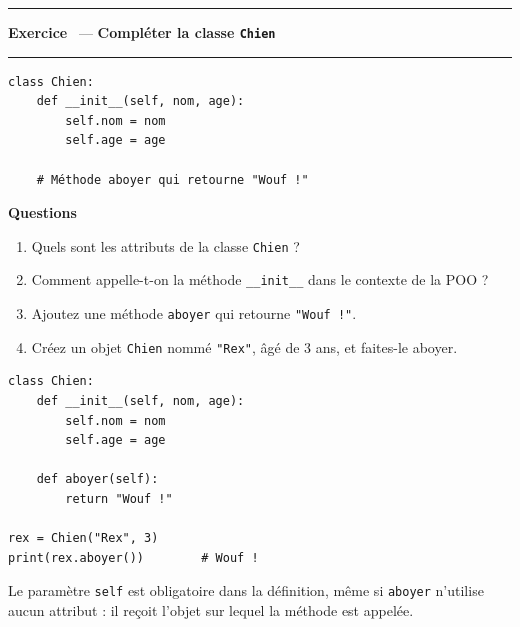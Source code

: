 \documentclass[10pt,a4paper]{article}
\newif\ifcorrige
\newcommand{\py}[1]{\texttt{#1}}
\newcounter{exo}
\newcommand{\exo}[1]{%
  \stepcounter{exo}\par\vspace{4pt}
  \ifcorrige\else\noindent\minipage{\textwidth}\fi
  \noindent\textcolor{qbar}{\rule{2.5pt}{10pt}}\hspace{4pt}%
  \textbf{\color{qbar}Exercice \theexo}\ --- \textbf{#1}%
  \par\nobreak\vspace{-3pt}\noindent\textcolor{qbar!35}{\rule{\textwidth}{0.6pt}}%
  \par\nobreak\vspace{1pt}}
\newenvironment{codebloc}
  {\ifcorrige\else\noindent\minipage[t]{0.50\textwidth}\vspace{0pt}\fi}
  {\ifcorrige\else\endminipage\hfill\fi}
\newenvironment{qbloc}
  {\ifcorrige\else\minipage[t]{0.475\textwidth}\vspace{0pt}\fi
   \textbf{\small Questions}\begin{enumerate}[leftmargin=*,nosep,label=\arabic*.]}
  {\end{enumerate}\ifcorrige\else\endminipage\par\fi}
\newcommand{\rep}[1]{\ifcorrige\par\smallskip{\color{corr}\small#1}\par\smallskip\fi}
\newlength{\zoneadj}\setlength{\zoneadj}{0pt}
\newcommand{\zone}[1][4cm]{%
  \ifcorrige\else
    \par\vspace{2pt}\noindent
    \begin{tcolorbox}[colback=white,colframe=black!45,boxrule=0.5pt,arc=1pt,height={\dimexpr#1-\zoneadj\relax},
      left=4pt,right=4pt,top=2pt,bottom=2pt,
      title={\scriptsize\itshape Réponses},coltitle=black!55,fonttitle=\itshape,
      detach title,before upper={\tcbtitle\par}]\end{tcolorbox}%
    \endminipage\par
  \fi}
\newenvironment{solution}
  {\ifcorrige
     \begin{tcolorbox}[enhanced,breakable,colback=corrbg,colframe=corr,boxrule=0.6pt,arc=1pt,
       left=5pt,right=5pt,top=3pt,bottom=3pt,fontupper=\small,
       title={Corrigé},coltitle=corr,fonttitle=\bfseries\small,detach title,
       before upper={\tcbtitle\par\smallskip}]%
   \else
     \setbox0\vbox\bgroup
   \fi}
  {\ifcorrige\end{tcolorbox}\else\egroup\fi}
\begin{document}
\exo{Compléter la classe \py{Chien}}
\begin{codebloc}
\begin{lstlisting}
class Chien:
    def __init__(self, nom, age):
        self.nom = nom
        self.age = age

    # Méthode aboyer qui retourne "Wouf !"
\end{lstlisting}
\end{codebloc}
\begin{qbloc}
  \item Quels sont les attributs de la classe \py{Chien} ?
    \rep{\py{nom} et \py{age}, deux attributs d'instance.}
  \item Comment appelle-t-on la méthode \py{__init__} dans le contexte de la POO ?
    \rep{Le \textbf{constructeur} (ou initialiseur). C'est une \emph{méthode spéciale} ; on ne
    l'appelle jamais directement, elle est déclenchée par \py{Chien("Rex", 3)}.}
  \item Ajoutez une méthode \py{aboyer} qui retourne \py{"Wouf !"}.
  \item Créez un objet \py{Chien} nommé \py{"Rex"}, âgé de 3 ans, et faites-le aboyer.
\end{qbloc}
\zone[3.8cm]
\begin{solution}
\begin{lstlisting}
class Chien:
    def __init__(self, nom, age):
        self.nom = nom
        self.age = age

    def aboyer(self):
        return "Wouf !"

rex = Chien("Rex", 3)
print(rex.aboyer())        # Wouf !
\end{lstlisting}
Le paramètre \py{self} est obligatoire dans la définition, même si \py{aboyer} n'utilise aucun
attribut : il reçoit l'objet sur lequel la méthode est appelée.
\end{solution}
\end{document}
